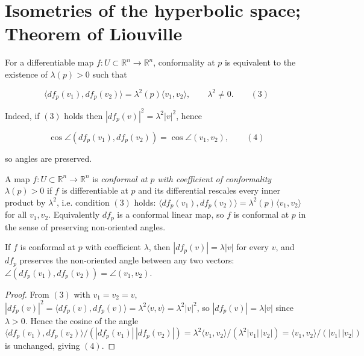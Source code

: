 \section{Isometries of the hyperbolic space; Theorem of Liouville}

For a differentiable map $f:U\subset\mathbb R^n\to\mathbb R^n$, conformality at
$p$ is equivalent to the existence of $\lambda(p)>0$ such that

$$
\langle df_p(v_1),df_p(v_2)\rangle=\lambda^2(p)\langle v_1,v_2\rangle,\qquad\lambda^2\neq 0.\qquad(3)
$$

Indeed, if $(3)$ holds then $|df_p(v)|^2=\lambda^2|v|^2$, hence

$$
\cos\angle(df_p(v_1),df_p(v_2))=\cos\angle(v_1,v_2),\qquad(4)
$$

so angles are preserved.

\begin{definition}
  \label{def:dc-ch8-5-conformal}
  \leanok
  A map $f:U\subset\mathbb{R}^n\to\mathbb{R}^n$ is \emph{conformal at $p$ with
  coefficient of conformality $\lambda(p)>0$} if $f$ is differentiable at $p$ and
  its differential rescales every inner product by $\lambda^2$, i.e. condition
  $(3)$ holds:
  $\langle df_p(v_1),df_p(v_2)\rangle=\lambda^2(p)\langle v_1,v_2\rangle$ for all
  $v_1,v_2$. Equivalently $df_p$ is a conformal linear map, so $f$ is conformal at
  $p$ in the sense of preserving non-oriented angles.
\end{definition}

\begin{lemma}
  \label{lem:dc-ch8-5-conformal-angle}
  \leanok
  If $f$ is conformal at $p$ with coefficient $\lambda$, then $|df_p(v)|=\lambda|v|$
  for every $v$, and $df_p$ preserves the non-oriented angle between any two
  vectors: $\angle(df_p(v_1),df_p(v_2))=\angle(v_1,v_2)$.
\end{lemma}
\begin{proof}
  \leanok
\sketch
  From $(3)$ with $v_1=v_2=v$, $|df_p(v)|^2=\langle df_p(v),df_p(v)\rangle
  =\lambda^2\langle v,v\rangle=\lambda^2|v|^2$, so $|df_p(v)|=\lambda|v|$ since
  $\lambda>0$. Hence the cosine of the angle
  $\langle df_p(v_1),df_p(v_2)\rangle/(|df_p(v_1)|\,|df_p(v_2)|)
  =\lambda^2\langle v_1,v_2\rangle/(\lambda^2|v_1|\,|v_2|)
  =\langle v_1,v_2\rangle/(|v_1|\,|v_2|)$
  is unchanged, giving $(4)$.
\end{proof}

